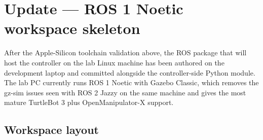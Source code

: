 \documentclass[11pt]{article}
\begin{document}
\clearpage

\section{Update --- ROS 1 Noetic workspace skeleton}

After the Apple-Silicon toolchain validation above, the ROS package
that will host the controller on the lab Linux machine has been
authored on the development laptop and committed alongside the
controller-side Python module. The lab PC currently runs ROS 1 Noetic
with Gazebo Classic, which removes the gz-sim issues seen with ROS 2
Jazzy on the same machine and gives the most mature TurtleBot 3 plus
OpenManipulator-X support.

\subsection{Workspace layout}
\end{document}
